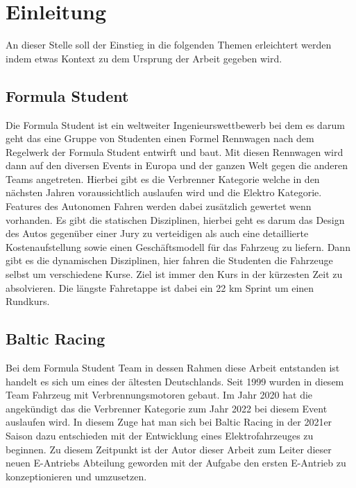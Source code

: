 


\chapter{Einleitung}

An dieser Stelle soll der Einstieg in die folgenden Themen erleichtert werden indem etwas Kontext zu dem Ursprung der Arbeit gegeben wird.

\section{Formula Student}
Die Formula Student ist ein weltweiter Ingenieurswettbewerb bei dem es darum geht das eine Gruppe von Studenten einen Formel Rennwagen nach dem Regelwerk der Formula Student entwirft und baut. Mit diesen Rennwagen wird dann auf den diversen Events in Europa und der ganzen Welt gegen die anderen Teams angetreten. Hierbei gibt es die Verbrenner Kategorie welche in den nächsten Jahren voraussichtlich auslaufen wird und die Elektro Kategorie. Features des Autonomen Fahren werden dabei zusätzlich gewertet wenn vorhanden. Es gibt die statischen Disziplinen, hierbei geht es darum das Design des Autos gegenüber einer Jury zu verteidigen als auch eine detaillierte Kostenaufstellung sowie einen Geschäftsmodell für das Fahrzeug zu liefern. Dann gibt es die dynamischen Disziplinen, hier fahren die Studenten die Fahrzeuge selbst um verschiedene Kurse. Ziel ist immer den Kurs in der kürzesten Zeit zu absolvieren. Die längste Fahretappe ist dabei ein 22 km Sprint um einen Rundkurs.

\section{Baltic Racing}
Bei dem Formula Student Team in dessen Rahmen diese Arbeit entstanden ist handelt es sich um eines der ältesten Deutschlands. Seit 1999 wurden in diesem Team Fahrzeug mit Verbrennungsmotoren gebaut. Im Jahr 2020 hat die  angekündigt das die Verbrenner Kategorie zum Jahr 2022 bei diesem Event auslaufen wird. In diesem Zuge hat man sich bei Baltic Racing in der 2021er Saison dazu entschieden mit der Entwicklung eines Elektrofahrzeuges zu beginnen. Zu diesem Zeitpunkt ist der Autor dieser Arbeit zum Leiter dieser neuen E-Antriebs Abteilung geworden mit der Aufgabe den ersten E-Antrieb zu konzeptionieren und umzusetzen.

